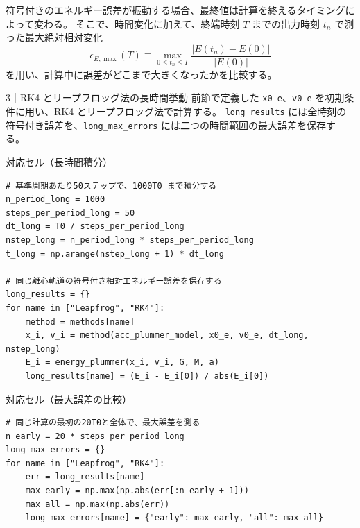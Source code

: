 符号付きのエネルギー誤差が振動する場合、最終値は計算を終えるタイミングによって変わる。
そこで、時間変化に加えて、終端時刻 $T$ までの出力時刻 $t_n$ で測った最大絶対相対変化
\begin{equation}
 \epsilon_{E,\max}(T)\equiv\max_{0\le t_n\le T}\frac{|E(t_n)-E(0)|}{|E(0)|}
\label{eq:ch3-max-energy-error}
\end{equation}
を用い、計算中に誤差がどこまで大きくなったかを比較する。
\begin{notebookblock}{3｜RK4 とリープフロッグ法の長時間挙動}
前節で定義した \texttt{x0\_e}、\texttt{v0\_e} を初期条件に用い、RK4 とリープフロッグ法で計算する。
\texttt{long\_results} には全時刻の符号付き誤差を、\texttt{long\_max\_errors} には二つの時間範囲の最大誤差を保存する。

\par\smallskip\noindent\begin{minipage}{\linewidth}
{\sffamily\small\color{graytext}対応セル（長時間積分）}
\begin{Verbatim}[xleftmargin=2mm,fontsize=\small,frame=single,framesep=1.8mm,framerule=0.35pt,rulecolor=\color{listingframe},fillcolor=\color{listingbg}]
# 基準周期あたり50ステップで、1000T0 まで積分する
n_period_long = 1000
steps_per_period_long = 50
dt_long = T0 / steps_per_period_long
nstep_long = n_period_long * steps_per_period_long
t_long = np.arange(nstep_long + 1) * dt_long

# 同じ離心軌道の符号付き相対エネルギー誤差を保存する
long_results = {}
for name in ["Leapfrog", "RK4"]:
    method = methods[name]
    x_i, v_i = method(acc_plummer_model, x0_e, v0_e, dt_long, nstep_long)
    E_i = energy_plummer(x_i, v_i, G, M, a)
    long_results[name] = (E_i - E_i[0]) / abs(E_i[0])
\end{Verbatim}
\end{minipage}

\par\smallskip\noindent\begin{minipage}{\linewidth}
{\sffamily\small\color{graytext}対応セル（最大誤差の比較）}
\begin{Verbatim}[xleftmargin=2mm,fontsize=\small,frame=single,framesep=1.8mm,framerule=0.35pt,rulecolor=\color{listingframe},fillcolor=\color{listingbg}]
# 同じ計算の最初の20T0と全体で、最大誤差を測る
n_early = 20 * steps_per_period_long
long_max_errors = {}
for name in ["Leapfrog", "RK4"]:
    err = long_results[name]
    max_early = np.max(np.abs(err[:n_early + 1]))
    max_all = np.max(np.abs(err))
    long_max_errors[name] = {"early": max_early, "all": max_all}
\end{Verbatim}
\end{minipage}


\end{notebookblock}
